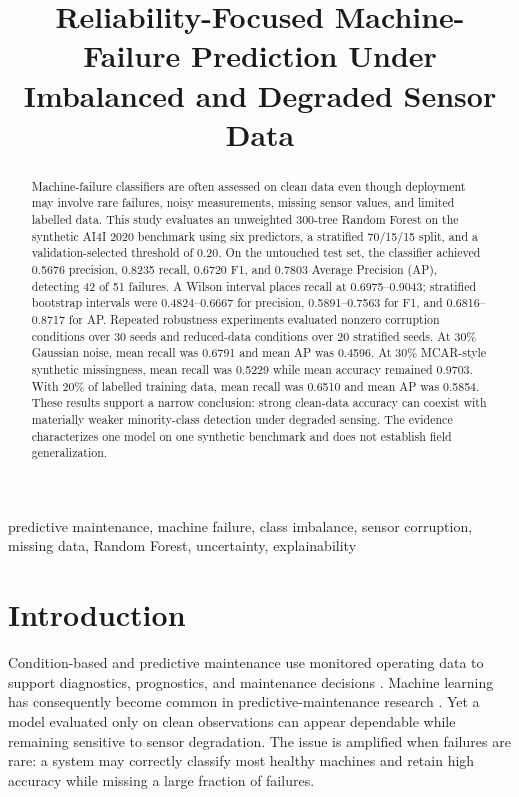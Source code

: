 \documentclass[conference]{IEEEtran}
\title{Reliability-Focused Machine-Failure Prediction Under Imbalanced and Degraded Sensor Data}
\author{}
\begin{document}
\maketitle

\begin{abstract}
Machine-failure classifiers are often assessed on clean data even though deployment may involve rare failures, noisy measurements, missing sensor values, and limited labelled data. This study evaluates an unweighted 300-tree Random Forest on the synthetic AI4I 2020 benchmark using six predictors, a stratified 70/15/15 split, and a validation-selected threshold of 0.20. On the untouched test set, the classifier achieved 0.5676 precision, 0.8235 recall, 0.6720 F1, and 0.7803 Average Precision (AP), detecting 42 of 51 failures. A Wilson interval places recall at 0.6975--0.9043; stratified bootstrap intervals were 0.4824--0.6667 for precision, 0.5891--0.7563 for F1, and 0.6816--0.8717 for AP. Repeated robustness experiments evaluated nonzero corruption conditions over 30 seeds and reduced-data conditions over 20 stratified seeds. At 30\% Gaussian noise, mean recall was 0.6791 and mean AP was 0.4596. At 30\% MCAR-style synthetic missingness, mean recall was 0.5229 while mean accuracy remained 0.9703. With 20\% of labelled training data, mean recall was 0.6510 and mean AP was 0.5854. These results support a narrow conclusion: strong clean-data accuracy can coexist with materially weaker minority-class detection under degraded sensing. The evidence characterizes one model on one synthetic benchmark and does not establish field generalization.
\end{abstract}

\begin{IEEEkeywords}
predictive maintenance, machine failure, class imbalance, sensor corruption, missing data, Random Forest, uncertainty, explainability
\end{IEEEkeywords}

\section{Introduction}
Condition-based and predictive maintenance use monitored operating data to support diagnostics, prognostics, and maintenance decisions \cite{jardine2006review}. Machine learning has consequently become common in predictive-maintenance research \cite{carvalho2019review,zonta2020review,susto2015pdm}. Yet a model evaluated only on clean observations can appear dependable while remaining sensitive to sensor degradation. The issue is amplified when failures are rare: a system may correctly classify most healthy machines and retain high accuracy while missing a large fraction of failures.
\end{document}
